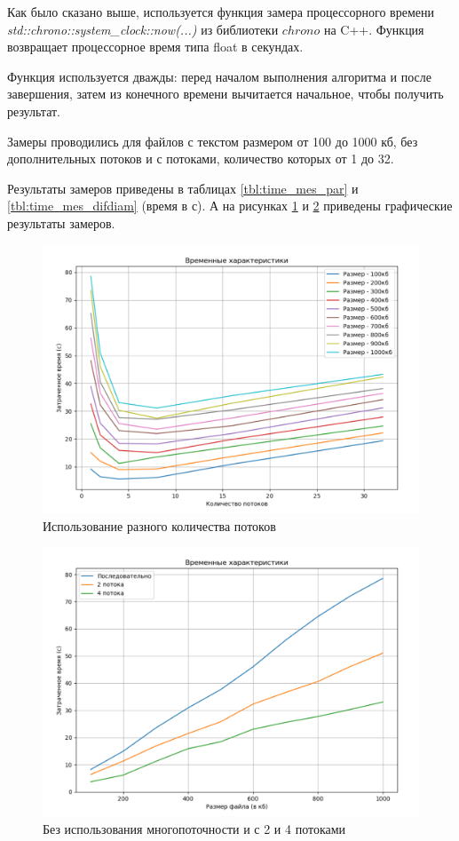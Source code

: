 Как было сказано выше, используется функция замера процессорного времени \textit{std::chrono::system\_clock::now(...)} из библиотеки $chrono$ на C++. Функция возвращает процессорное время типа float в секундах.

Функция используется дважды: перед началом выполнения алгоритма и после завершения, затем из конечного времени вычитается начальное, чтобы получить результат.

Замеры проводились для файлов с текстом размером от 100 до 1000 кб, без дополнительных потоков и с потоками, количество которых от 1 до 32.

Результаты замеров приведены в таблицах \ref{tbl:time_mes_par} и \ref{tbl:time_mes_difdiam} (время в с). А на рисунках \ref{fig:graph_all} и \ref{fig:graph_3} приведены графические результаты замеров.

\begin{figure}[h]
	\centering
	\includegraphics[width=\linewidth]{img/all}
	\caption{Использование разного количества потоков}
	\label{fig:graph_all}
\end{figure}

\begin{figure}[h]
	\centering
	\includegraphics[width=\linewidth]{img/3}
	\caption{Без использования многопоточности и с 2 и 4 потоками}
	\label{fig:graph_3}
\end{figure}

